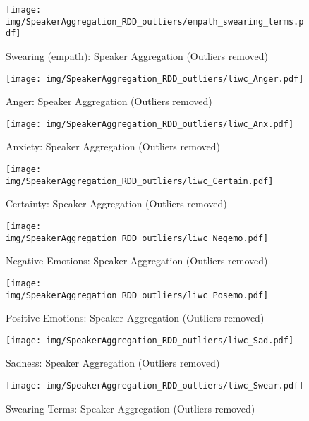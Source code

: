 \begin{figure}[h]\centering
\texttt{[image: img/SpeakerAggregation\_RDD\_outliers/empath\_swearing\_terms.pdf]}
\caption{Swearing (empath): Speaker Aggregation (Outliers removed)}
\label{fig: sa_Swearing (empath)}
\end{figure}

\begin{figure}[h]\centering
\texttt{[image: img/SpeakerAggregation\_RDD\_outliers/liwc\_Anger.pdf]}
\caption{Anger: Speaker Aggregation (Outliers removed)}
\label{fig: sa_Anger}
\end{figure}

\begin{figure}[h]\centering
\texttt{[image: img/SpeakerAggregation\_RDD\_outliers/liwc\_Anx.pdf]}
\caption{Anxiety: Speaker Aggregation (Outliers removed)}
\label{fig: sa_Anxiety}
\end{figure}

\begin{figure}[h]\centering
\texttt{[image: img/SpeakerAggregation\_RDD\_outliers/liwc\_Certain.pdf]}
\caption{Certainty: Speaker Aggregation (Outliers removed)}
\label{fig: sa_Certainty}
\end{figure}

\begin{figure}[h]\centering
\texttt{[image: img/SpeakerAggregation\_RDD\_outliers/liwc\_Negemo.pdf]}
\caption{Negative Emotions: Speaker Aggregation (Outliers removed)}
\label{fig: sa_Negative Emotions}
\end{figure}

\begin{figure}[h]\centering
\texttt{[image: img/SpeakerAggregation\_RDD\_outliers/liwc\_Posemo.pdf]}
\caption{Positive Emotions: Speaker Aggregation (Outliers removed)}
\label{fig: sa_Positive Emotions}
\end{figure}

\begin{figure}[h]\centering
\texttt{[image: img/SpeakerAggregation\_RDD\_outliers/liwc\_Sad.pdf]}
\caption{Sadness: Speaker Aggregation (Outliers removed)}
\label{fig: sa_Sadness}
\end{figure}

\begin{figure}[h]\centering
\texttt{[image: img/SpeakerAggregation\_RDD\_outliers/liwc\_Swear.pdf]}
\caption{Swearing Terms: Speaker Aggregation (Outliers removed)}
\label{fig: sa_Swearing Terms}
\end{figure}

